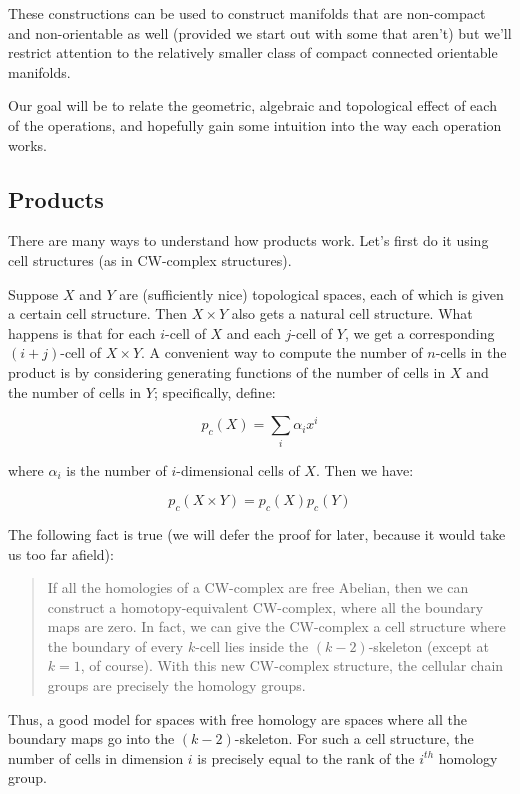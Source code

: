 \documentclass[a4paper]{amsart}
\begin{document}
These constructions can be used to construct manifolds that are
non-compact and non-orientable as well (provided we start out with
some that aren't) but we'll restrict attention to the relatively smaller
class of compact connected orientable manifolds.

Our goal will be to relate the geometric, algebraic and topological
effect of each of the operations, and hopefully gain some intuition
into the way each operation works.

\subsection{Products}

There are many ways to understand how products work. Let's first do it
using cell structures (as in CW-complex structures).

Suppose $X$ and $Y$ are (sufficiently nice) topological spaces, each
of which is given a certain cell structure. Then $X \times Y$ also
gets a natural cell structure. What happens is that for each $i$-cell
of $X$ and each $j$-cell of $Y$, we get a corresponding $(i+j)$-cell
of $X \times Y$. A convenient way to compute the number of $n$-cells
in the product is by considering generating functions of the number of
cells in $X$ and the number of cells in $Y$; specifically, define:

$$p_c(X) = \sum_i \alpha_i x^i$$

where $\alpha_i$ is the number of $i$-dimensional cells of $X$. Then we have:

$$p_c(X \times Y) = p_c(X)p_c(Y)$$

The following fact is true (we will defer the proof for later, because
it would take us too far afield):

\begin{quote}
  If all the homologies of a CW-complex are free Abelian, then we can
  construct a homotopy-equivalent CW-complex, where all the boundary
  maps are zero. In fact, we can give the CW-complex a cell structure
  where the boundary of every $k$-cell lies inside the
  $(k-2)$-skeleton (except at $k=1$, of course). With this new
  CW-complex structure, the cellular chain groups are precisely the
  homology groups.
\end{quote}

Thus, a good model for spaces with free homology are spaces where all
the boundary maps go into the $(k-2)$-skeleton. For such a cell
structure, the number of cells in dimension $i$ is precisely equal to
the rank of the $i^{th}$ homology group.
\end{document}
